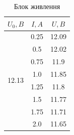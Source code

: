 \documentclass[a4paper,12pt]{article}
\begin{document}
	\begin{table}[h]
		\centering
		\caption{Блок живлення}
		\begin{tabular}{|c|c|c|}
			\hline
			\textbf{$U_0, B$}      & \textbf{$I, A$} & \textbf{$U, B$} \\ \hline
			\multirow{8}{*}{12.13} & 0.25            & 12.09           \\ \cline{2-3} 
			& 0.5             & 12.02           \\ \cline{2-3} 
			& 0.75            & 11.9            \\ \cline{2-3} 
			& 1.0             & 11.85           \\ \cline{2-3} 
			& 1.25            & 11.8            \\ \cline{2-3} 
			& 1.5             & 11.77           \\ \cline{2-3} 
			& 1.75            & 11.71           \\ \cline{2-3} 
			& 2.0             & 11.65           \\ \hline
		\end{tabular}
	\end{table}


	
	
	
	
	
\end{document}
